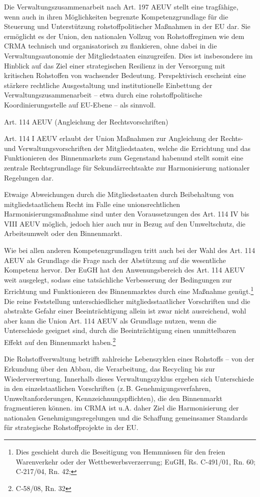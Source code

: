 \documentclass[12pt,a4paper,oneside]{book} %
\begin{document}
Die Verwaltungszusammenarbeit nach Art. 197 AEUV stellt eine tragfähige, wenn auch in ihren Möglichkeiten begrenzte Kompetenzgrundlage für die Steuerung und Unterstützung rohstoffpolitischer Maßnahmen in der EU dar. Sie ermöglicht es der Union, den nationalen Vollzug von Rohstoffregimen wie dem CRMA technisch und organisatorisch zu flankieren, ohne dabei in die Verwaltungsautonomie der Mitgliedstaaten einzugreifen. Dies ist insbesondere im Hinblick auf das Ziel einer strategischen Resilienz in der Versorgung mit kritischen Rohstoffen von wachsender Bedeutung. Perspektivisch erscheint eine stärkere rechtliche Ausgestaltung und institutionelle Einbettung der Verwaltungszusammenarbeit – etwa durch eine rohstoffpolitische Koordinierungsstelle auf EU-Ebene – als sinnvoll.
	
Art. 114 AEUV (Angleichung der Rechtsvorschriften)

Art. 114 I AEUV erlaubt der Union \glqq Maßnahmen zur Angleichung der Rechts- und Verwaltungsvorschriften der Mitgliedstaaten, welche die Errichtung und das Funktionieren des Binnenmarkets zum Gegenstand haben\grqq und stellt somit eine zentrale Rechtsgrundlage für Sekundärrechtsakte zur Harmonisierung nationaler Regelungen dar.
	
Etwaige Abweichungen durch die Mitgliedsstaaten durch Beibehaltung von mitgliedstaatlichem Recht im Falle eine unionsrechtlichen Harmonisierungsmaßnahme sind unter den Voraussetzungen des Art. 114 IV bis VIII AEUV möglich, jedoch hier auch nur in Bezug auf den Umweltschutz, die Arbeitsumwelt oder den Binnenmarkt.

Wie bei allen anderen Kompetenzgrundlagen tritt auch bei der Wahl des Art. 114 AEUV als Grundlage die Frage nach der Abstützung auf die wesentliche Kompetenz hervor.
Der EuGH hat den Anwenungsbereich des Art. 114 AEUV weit ausgelegt, sodass eine tatsächliche Verbesserung der Bedingungen zur Errichtung und Funktionieren des Binnenmarktes durch eine Maßnahme genügt.\footnote{Dies geschieht durch die Beseitigung von Hemmnissen für den freien Warenverkehr oder der Wettbewerbsverzerrung; EuGH, Rs. C-491/01, Rn. 60; C‑217/04, Rn. 42;} Die reine Feststellung unterschiedlicher mitgliedsstaatlicher Vorschriften und die abstrakte Gefahr einer Beeinträchtigung allein ist zwar nicht ausreichend, wohl aber kann die Union Art. 114 AEUV als Grundlage nutzen, wenn die Unterschiede geeignet sind, durch die Beeinträchtigung einen unmittelbaren Effekt auf den Binnenmarkt haben.\footnote{C‑58/08, Rn. 32}

Die Rohstoffverwaltung betrifft zahlreiche Lebenszyklen eines Rohstoffs – von der Erkundung über den Abbau, die Verarbeitung, das Recycling bis zur Wiederverwertung. Innerhalb dieses Verwaltungszyklus ergeben sich Unterschiede in den einzelstaatlichen Vorschriften (z. B. Genehmigungsverfahren, Umweltanforderungen, Kennzeichnungspflichten), die den Binnenmarkt fragmentieren können. im CRMA ist u.A. daher Ziel die Harmonisierung der nationalen Genehmigungsregelungen und die Schaffung gemeinsamer Standards für strategische Rohstoffprojekte in der EU.
\end{document}

